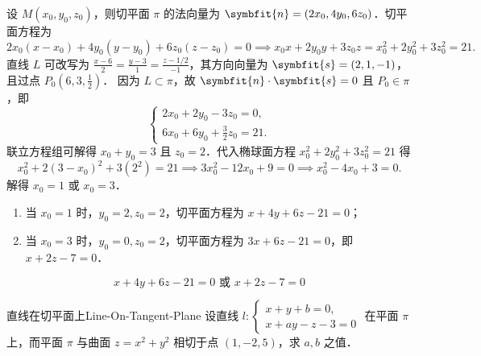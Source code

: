 \begin{solution}
    设 $M(x_0, y_0, z_0)$，则切平面 $\pi$ 的法向量为 $\symbfit{n} = (2x_0, 4y_0, 6z_0)$．切平面方程为
    \begin{equation}
        2x_0(x - x_0) + 4y_0(y - y_0) + 6z_0(z - z_0) = 0 \implies x_0x + 2y_0y + 3z_0z = x_0^2 + 2y_0^2 + 3z_0^2 = 21.
    \end{equation}
    直线 $L$ 可改写为 $\frac{x - 6}{2} = \frac{y - 3}{1} = \frac{z - 1/2}{-1}$，其方向向量为 $\symbfit{s} = (2, 1, -1)$，且过点 $P_0(6, 3, \frac{1}{2})$．
    因为 $L \subset \pi$，故 $\symbfit{n} \cdot \symbfit{s} = 0$ 且 $P_0 \in \pi$，即
    \begin{equation}
        \begin{cases}
            2x_0 + 2y_0 - 3z_0 = 0, \\
            6x_0 + 6y_0 + \frac{3}{2}z_0 = 21.
        \end{cases}
    \end{equation}
    联立方程组可解得 $x_0 + y_0 = 3$ 且 $z_0 = 2$．代入椭球面方程 $x_0^2 + 2y_0^2 + 3z_0^2 = 21$ 得
    \begin{equation}
        x_0^2 + 2(3 - x_0)^2 + 3(2^2) = 21 \implies 3x_0^2 - 12x_0 + 9 = 0 \implies x_0^2 - 4x_0 + 3 = 0.
    \end{equation}
    解得 $x_0 = 1$ 或 $x_0 = 3$．
    \begin{enumerate}
        \item 当 $x_0 = 1$ 时，$y_0 = 2, z_0 = 2$，切平面方程为 $x + 4y + 6z - 21 = 0$；
        \item 当 $x_0 = 3$ 时，$y_0 = 0, z_0 = 2$，切平面方程为 $3x + 6z - 21 = 0$，即 $x + 2z - 7 = 0$．
    \end{enumerate}
    \begin{equation}
        \boxed{x + 4y + 6z - 21 = 0 \text{ 或 } x + 2z - 7 = 0}
    \end{equation}
\end{solution}


\begin{problem}{直线在切平面上}{Line-On-Tangent-Plane}
    设直线 $l: \begin{cases} x + y + b = 0, \\ x + ay - z - 3 = 0 \end{cases}$ 在平面 $\pi$ 上，而平面 $\pi$ 与曲面 $z = x^2 + y^2$ 相切于点 $(1, -2, 5)$，求 $a, b$ 之值．
\end{problem}

